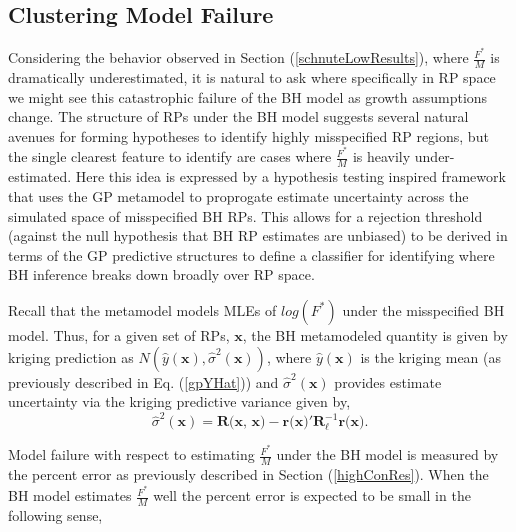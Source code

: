 
%
\subsection{Clustering Model Failure}

%
Considering the behavior observed in Section (\ref{schnuteLowResults}), where
$\frac{F^*}{M}$ is dramatically underestimated, it is natural to ask
where specifically in RP space we might see this catastrophic failure of the
BH model as growth assumptions change.
%
The structure of RPs under the BH model suggests several natural avenues for
forming hypotheses to identify highly misspecified RP regions, but the single
clearest feature to identify are cases where $\frac{F^*}{M}$ is
heavily under-estimated. Here this idea is expressed by a hypothesis testing
inspired framework that uses the GP metamodel to proprogate estimate
uncertainty across the simulated space of misspecified BH RPs.
This allows for a rejection threshold (against the null hypothesis that BH RP
estimates are unbiased) to be derived in terms of the GP predictive structures
to define a classifier for identifying where BH inference breaks down
broadly over RP space.


%
Recall that the metamodel models MLEs of $log(F^*)$ under the misspecified BH model.
Thus, for a given set of RPs, $\textbf{x}$, the BH metamodeled
quantity is given by kriging prediction as $N(\hat y(\textbf{x}), \hat \sigma^2(\textbf{x}))$,
where $\hat y(\textbf{x})$ is the kriging mean (as previously described in
Eq. (\ref{gpYHat})) and $\hat \sigma^2(\textbf{x})$ provides estimate
uncertainty via the kriging predictive variance given by,
\begin{equation} %
       \hat \sigma^2(\textbf{x}) = \textbf{R(x, x)} - \textbf{r(x)}'\bm{R}^{-1}_{\bm{\ell}}\textbf{r(x)}.
\end{equation}

%
Model failure with respect to estimating $\frac{F^*}{M}$ under the BH
model is measured by the percent error as previously described in Section (\ref{highConRes}).
When the BH model estimates $\frac{F^*}{M}$ well the percent error is
expected to be small in the following sense,

